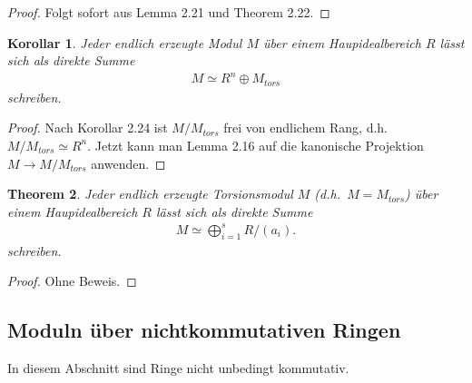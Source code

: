 \documentclass[reqno,12pt]{article}
\numberwithin{equation}{section}
\newcommand{\iso}{\simeq}
\theoremstyle{plain}
\newtheorem{thm}{Theorem}[section]
\newtheorem{cor}[thm]{Korollar}
\theoremstyle{definition}
\begin{document}
\begin{proof}
Folgt sofort aus Lemma 2.21 und Theorem 2.22.
\end{proof}

\begin{cor}
Jeder endlich erzeugte Modul $M$ über einem Haupidealbereich $R$ lässt sich als direkte Summe
\begin{align*}
M \iso   R^n  \oplus  M_{tors}
\end{align*}
schreiben.
\end{cor}

\begin{proof}
Nach Korollar 2.24 ist $M/M_{tors}$ frei von endlichem Rang, d.h.\ $M/M_{tors} \iso R^n$. Jetzt kann man Lemma 2.16 auf die kanonische Projektion $M \to M/M_{tors}$ anwenden.
\end{proof}


\begin{thm}
Jeder endlich erzeugte Torsionsmodul $M$ (d.h.\ $M=M_{tors}$) über einem Haupidealbereich $R$ lässt sich als direkte Summe
\begin{align*}
M \iso   \bigoplus_{i=1}^s  R/(a_i).
\end{align*}
schreiben.
\end{thm}

\begin{proof}
Ohne Beweis.
\end{proof}




\subsection{Moduln über nichtkommutativen Ringen}

In diesem Abschnitt sind Ringe nicht unbedingt kommutativ.
\end{document}
